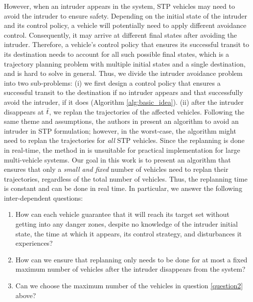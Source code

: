 However, when an intruder appears in the system, STP vehicles may need to avoid the intruder to ensure safety. Depending on the initial state of the intruder and its control policy, a vehicle will potentially need to apply different avoidance control. Consequently, it may arrive at different final states after avoiding the intruder. Therefore, a vehicle's control policy that ensures its successful transit to its destination needs to account for all such possible final states, which is a trajectory planning problem with multiple initial states and a single destination, and is hard to solve in general. Thus, we divide the intruder avoidance problem into two sub-problems: (i) we first design a control policy that ensures a successful transit to the destination if no intruder appears and that successfully avoid the intruder, if it does (Algorithm \ref{alg:basic_idea}). (ii) after the intruder disappears at $\bar{t}$, we replan the trajectories of the affected vehicles. Following the same theme and assumptions, the authors in \cite{chen2016robust} present an algorithm to avoid an intruder in STP formulation; however, in the worst-case, the algorithm might need to replan the trajectories for \textit{all} STP vehicles. Since the replanning is done in real-time, the method in \cite{chen2016robust} is unsuitable for practical implementation for large multi-vehicle systems. Our goal in this work is to present an algorithm that ensures that only a \textit{small and fixed} number of vehicles need to replan their trajectories, regardless of the total number of vehicles. Thus, the replanning time is constant and can be done in real time. In particular, we answer the following inter-dependent questions:
\begin{enumerate}
\item How can each vehicle guarantee that it will reach its target set without getting into any danger zones, despite no knowledge of the intruder initial state, the time at which it appears, its control strategy, and disturbances it experiences?
\item How can we ensure that replanning only needs to be done for at most a fixed maximum number of vehicles after the intruder disappears from the system? \label{question2}
\item Can we choose the maximum number of the vehicles in question \ref{question2} above?
\end{enumerate}


